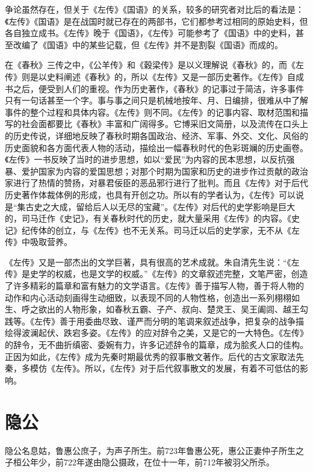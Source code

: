 \documentclass[a4paper,12pt,UTF8,twoside]{ctexbook}
\begin{document}
争论虽然存在，但关于《左传》《国语》的关系，较多的研究者对比后的看法是：《左传》《国语》是在战国时就已存在的两部书，它们都参考过相同的原始史料，但各自独立成书。《左传》晚于《国语》，《左传》可能参考了《国语》中的史料，甚至改编了《国语》中的某些记载，但《左传》并不是割裂《国语》而成的。

在《春秋》三传之中，《公羊传》和《穀梁传》是以义理解说《春秋》的，而《左传》则是以史料阐述《春秋》的，所以《左传》又是一部历史著作。《左传》自成书之后，便受到人们的重视。作为历史著作，《春秋》的记事过于简洁，许多事件只有一句话甚至一个字。事与事之间只是机械地按年、月、日编排，很难从中了解事件的整个过程和具体内容。《左传》则不同。《左传》的记事内容、取材范围和描写的社会面都要比《春秋》丰富和广阔得多。它博采旧文简册，以及流传在口头上的历史传说，详细地反映了春秋时期各国政治、经济、军事、外交、文化、风俗的历史面貌和各方面代表人物的活动，描绘出一幅春秋时代的色彩斑斓的历史画卷。《左传》一书反映了当时的进步思想，如以“爱民”为内容的民本思想，以反抗强暴、爱护国家为内容的爱国思想；对那个时期为国家和历史的进步作过贡献的政治家进行了热情的赞扬，对暴君佞臣的恶品邪行进行了批判。而且《左传》对于后代历史著作体裁体例的形成，也具有开创之功。所以有的学者认为，《左传》可以说是“集古史之大成，留给后人以无尽的宝藏”。《左传》对后代的史学影响是巨大的，司马迁作《史记》，有关春秋时代的历史，就大量采用《左传》的内容。《史记》纪传体的创立，与《左传》也不无关系。司马迁以后的史学家，无不从《左传》中吸取营养。

《左传》又是一部杰出的文学巨著，具有很高的艺术成就。朱自清先生说：“《左传》是史学的权威，也是文学的权威。”《左传》的文章叙述完整，文笔严密，创造了许多精彩的篇章和富有魅力的文学语言。《左传》善于描写人物，善于将人物的动作和内心活动刻画得生动细致，以表现不同的人物性格，创造出一系列栩栩如生、呼之欲出的人物形象，如春秋五霸、子产、叔向、楚灵王、吴王阖闾、越王勾践等。《左传》善于用委曲尽致、谨严而分明的笔调来叙述战争，把复杂的战争描绘得波澜起伏、跌宕多姿。《左传》的应对辞令之美，又是它的一大特色。《左传》的辞令，无不曲折缜密、委婉有力，许多记述辞令的篇章，成为脍炙人口的佳构。正因为如此，《左传》成为先秦时期最优秀的叙事散文著作。后代的古文家取法先秦，多模仿《左传》。所以，《左传》对于后代叙事散文的发展，有着不可低估的影响。

\mainmatter

\chapter{隐公}

隐公名息姑，鲁惠公庶子，为声子所生。前723年鲁惠公死，惠公正妻仲子所生之子桓公年少，前722年遂由隐公摄政，在位十一年，前712年被羽父所杀。
\end{document}
